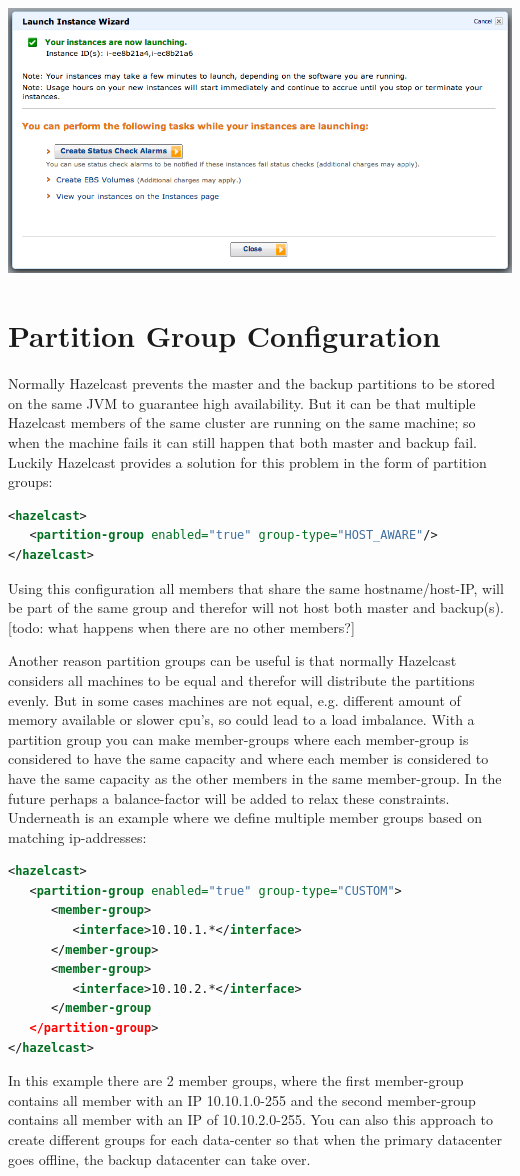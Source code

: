 \includegraphics[scale=0.40]{ec2-10.png}

\section{Partition Group Configuration}
Normally Hazelcast prevents the master and the backup partitions to be stored on the same JVM to guarantee high availability. But it can be that multiple Hazelcast members of the same cluster are running on the same machine; so when the machine fails it can still happen that both master and backup fail. Luckily Hazelcast provides a solution for this problem in the form of partition groups:
\begin{lstlisting}[language=xml]
<hazelcast>
   <partition-group enabled="true" group-type="HOST_AWARE"/>
</hazelcast>
\end{lstlisting}
Using this configuration all members that share the same hostname/host-IP, will be part of the same group and therefor will not host both master and backup(s). [todo: what happens when there are no other members?] 

Another reason partition groups can be useful is that normally Hazelcast considers all machines to be equal and therefor will distribute the partitions evenly. But in some cases machines are not equal, e.g. different amount of memory available or slower cpu's, so could lead to a load imbalance. With a partition group you can make member-groups where each member-group is considered to have the same capacity and where each member is considered to have the same capacity as the other members in the same member-group. In the future perhaps a balance-factor will be added to relax these constraints. Underneath is an example where we define multiple member groups based on matching ip-addresses:
\begin{lstlisting}[language=xml]
<hazelcast>
   <partition-group enabled="true" group-type="CUSTOM">
      <member-group>
         <interface>10.10.1.*</interface>
      </member-group>
      <member-group>
         <interface>10.10.2.*</interface>
      </member-group
   </partition-group>
</hazelcast>
\end{lstlisting}
In this example there are 2 member groups, where the first member-group contains all member with an IP 10.10.1.0-255 and the second member-group contains all member with an IP of 10.10.2.0-255. You can also this approach to create different groups for each data-center so that when the primary datacenter goes offline, the backup datacenter can take over.

